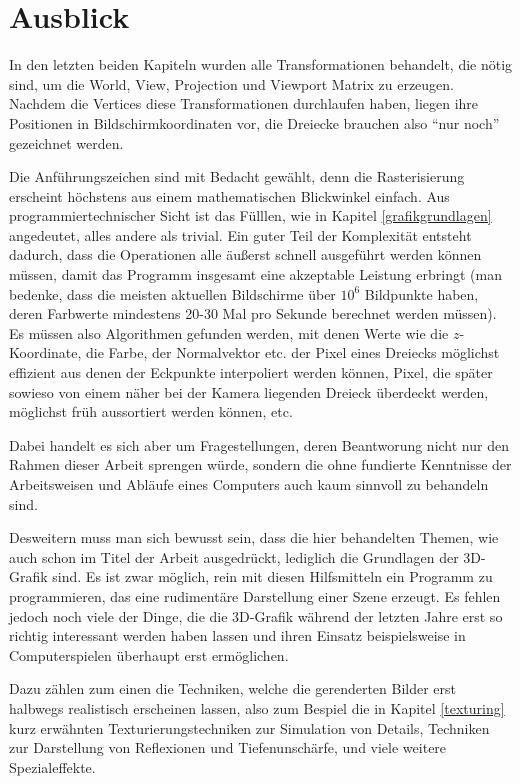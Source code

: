 \chapter{Ausblick}

In den letzten beiden Kapiteln wurden alle Transformationen behandelt, die nötig sind, um die World, View, Projection und Viewport Matrix zu erzeugen. Nachdem die Vertices diese Transformationen durchlaufen haben, liegen ihre Positionen in Bildschirmkoordinaten vor, die Dreiecke brauchen also \enquote{nur noch} gezeichnet werden.

Die Anführungszeichen sind mit Bedacht gewählt, denn die Rasterisierung erscheint höchstens aus einem mathematischen Blickwinkel einfach. Aus programmiertechnischer Sicht ist das Fülllen, wie in Kapitel \ref{grafikgrundlagen} angedeutet, alles andere als trivial. Ein guter Teil der Komplexität entsteht dadurch, dass die Operationen alle äußerst schnell ausgeführt werden können müssen, damit das Programm insgesamt eine akzeptable Leistung erbringt (man bedenke, dass die meisten aktuellen Bildschirme über $10^6$ Bildpunkte haben, deren Farbwerte mindestens 20-30 Mal pro Sekunde berechnet werden müssen). Es müssen also Algorithmen gefunden werden, mit denen Werte wie die $z$-Koordinate, die Farbe, der Normalvektor etc. der Pixel eines Dreiecks möglichst effizient aus denen der Eckpunkte interpoliert werden können, Pixel, die später sowieso von einem näher bei der Kamera liegenden Dreieck überdeckt werden, möglichst früh aussortiert werden können, etc.

Dabei handelt es sich aber um Fragestellungen, deren Beantworung nicht nur den Rahmen dieser Arbeit sprengen würde, sondern die ohne fundierte Kenntnisse der Arbeitsweisen und Abläufe eines Computers auch kaum sinnvoll zu behandeln sind.

Desweitern muss man sich bewusst sein, dass die hier behandelten Themen, wie auch schon im Titel der Arbeit ausgedrückt, lediglich die Grundlagen der 3D-Grafik sind. Es ist zwar möglich, rein mit diesen Hilfsmitteln ein Programm zu programmieren, das eine rudimentäre Darstellung einer Szene erzeugt. Es fehlen jedoch noch viele der Dinge, die die 3D-Grafik während der letzten Jahre erst so richtig interessant werden haben lassen und ihren Einsatz beispielsweise in Computerspielen überhaupt erst ermöglichen.

Dazu zählen zum einen die Techniken, welche die gerenderten Bilder erst halbwegs realistisch erscheinen lassen, also zum Bespiel die in Kapitel \ref{texturing} kurz erwähnten Texturierungstechniken zur Simulation von Details, Techniken zur Darstellung von Reflexionen und Tiefenunschärfe, und viele weitere Spezialeffekte.

